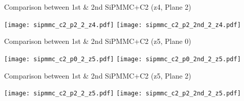 \documentclass{beamer}
\begin{document}
\begin{frame}{Comparison between 1st \& 2nd SiPMMC+C2 (z4, Plane 2)}
\begin{adjustwidth}{-1.5em}{-1.5em}
	\texttt{[image: sipmmc\_c2\_p2\_2\_z4.pdf]}
	\texttt{[image: sipmmc\_c2\_p2\_2nd\_2\_z4.pdf]}
\end{adjustwidth}
\end{frame}

\begin{frame}{Comparison between 1st \& 2nd SiPMMC+C2 (z5, Plane 0)}
\begin{adjustwidth}{-1.5em}{-1.5em}
	\texttt{[image: sipmmc\_c2\_p0\_2\_z5.pdf]}
	\texttt{[image: sipmmc\_c2\_p0\_2nd\_2\_z5.pdf]}
\end{adjustwidth}
\end{frame}

\begin{frame}{Comparison between 1st \& 2nd SiPMMC+C2 (z5, Plane 2)}
\begin{adjustwidth}{-1.5em}{-1.5em}
	\texttt{[image: sipmmc\_c2\_p2\_2\_z5.pdf]}
	\texttt{[image: sipmmc\_c2\_p2\_2nd\_2\_z5.pdf]}
\end{adjustwidth}
\end{frame}

 
\end{document}
